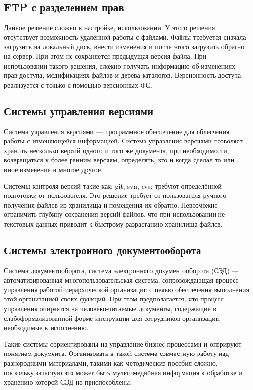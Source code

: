 \documentclass[utf8,usehyperref,12pt]{G7-32}
\begin{document}
\subsection{FTP с разделением прав}

Данное решение сложно в настройке, использовании. У этого решения отсутствует возможность 
удалённой работы с файлами. Файлы требуется сначала загрузить на локальный диск, внести 
изменения и после этого загрузить обратно на сервер. При этом не сохраняется предыдущая версия файла. При использовании такого решения, сложно получать информацию об изменениях прав доступа, модификациях файлов и дерева каталогов. Версионность доступа реализуется с только с помощью версионных ФС.

\subsection{Системы управления версиями}
Система управления версиями — программное обеспечение для облегчения работы с изменяющейся информацией. Система управления версиями позволяет хранить несколько версий одного и того же документа, при необходимости, возвращаться к более ранним версиям, определять, кто и когда сделал то или иное изменение и многое другое.

Системы контроля версий такие как: git, svn, cvs; требуют определённой подготовки от пользователя. Это решение требует от пользователя ручного получения файлов из хранилища и помещения их обратно. Невозможно ограничить глубину сохранения версий файлов, что при использовании не-текстовых данных приводит к быстрому разрастанию хранилища файлов.

\subsection{Системы электронного документооборота}
Система документооборота, система электронного документооборота (СЭД) — автоматизированная многопользовательская система, сопровождающая процесс управления работой иерархической организации с целью обеспечения выполнения этой организацией своих функций. При этом предполагается, что процесс управления опирается на человеко-читаемые документы, содержащие в слабоформализованной форме инструкции для сотрудников организации, необходимые к исполнению.

Такие системы оориентированы на управление бизнес-процессами и оперируют понятием документа. Организовать в такой системе совместную работу над разнородными материалами, такими как методические пособия сложно, поскольку зачастую это может быть мультимедийная информация к обработке и хранению которой СЭД не приспособлены.
\end{document}
